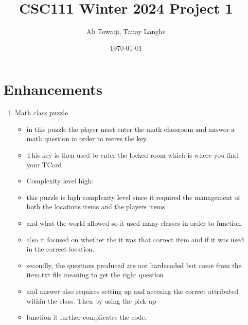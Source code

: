\documentclass[11pt]{article}
\title{CSC111 Winter 2024 Project 1}
\author{Ali Towaiji, Tanay Langhe}
\date{\today}
\begin{document}
\maketitle

\section*{Enhancements}


\begin{enumerate}

\item Math class puzzle
	\begin{itemize}
	\item in this puzzle the player must enter the math classroom and answer a math question in order to recive the key.
	\item This key is then used to enter the locked room which is where you find your TCard
	\item Complexity level high:
	\item this puzzle is high complexity level since it required the management of both the locations items and the players items
	\item and what the world allowed so it used many classes in order to function.
	\item also it focused on whether the it was that correct item and if it was used in the correct location.
	\item secondly, the questions produced are not hardecoded but come from the item.txt file meaning to get the right question
	\item and answer also requires setting up and accesing the correct attributed within the class. Then by using the pick-up
	\item function it further complicates the code.
	\end{itemize}


\end{enumerate}
\end{document}
